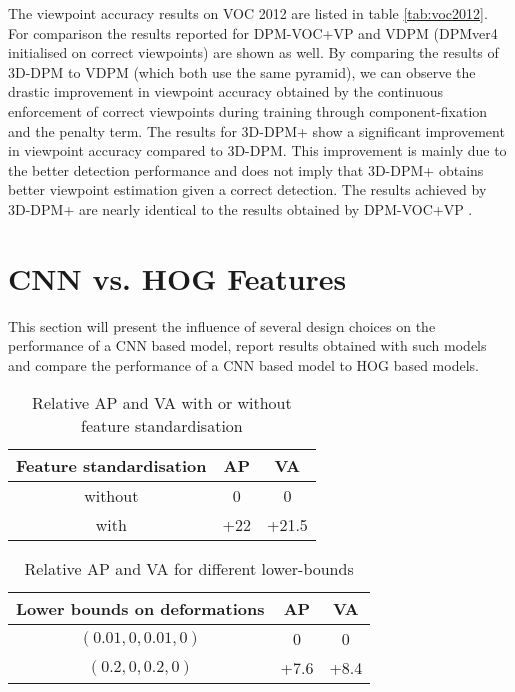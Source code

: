 The viewpoint accuracy results on VOC 2012 are listed in table \ref{tab:voc2012}. For comparison the results reported for DPM-VOC+VP and VDPM (DPMver4 initialised on correct viewpoints) are shown as well. By comparing the results of 3D-DPM to VDPM (which both use the same pyramid), we can observe the drastic improvement in viewpoint accuracy obtained by the continuous enforcement of correct viewpoints during training through component-fixation and the penalty term. The results for 3D-DPM+ show a significant improvement in viewpoint accuracy compared to 3D-DPM. This improvement is mainly due to the better detection performance and does not imply that 3D-DPM+ obtains better viewpoint estimation given a correct detection. The results achieved by  3D-DPM+ are nearly identical to the results obtained by DPM-VOC+VP \cite{6248075}.

\section{CNN vs. HOG Features}\label{sec:cnnexp}	

This section will present the influence of several design choices on the performance of a CNN based model, report results obtained with such models and compare the performance of a CNN based model to HOG based models. 

\begin{table}[]
	\begin{center}
		\begin{tabular}{|c|c|c|}
		\hline
		Feature standardisation & AP & VA\\
		\hline\hline
		 without & 0 & 0\\
		\hline 
		 with & +22 & +21.5 \\
		 \hline 
		\end{tabular}
	\end{center}
	\caption{Relative AP and VA with or without feature standardisation}
	\label{tab:featStand}
\end{table}

\begin{table}[]
	\begin{center}
		\begin{tabular}{|c|c|c|}
		\hline
		Lower bounds on deformations & AP & VA\\
		\hline\hline
		 $(0.01, 0, 0.01, 0)$ & 0 & 0\\
		\hline 
		 $(0.2, 0, 0.2, 0)$ & +7.6 & +8.4 \\
		 \hline 
		\end{tabular}
	\end{center}
	\caption{Relative AP and VA for different lower-bounds}
	\label{tab:lowerbound}
\end{table}


